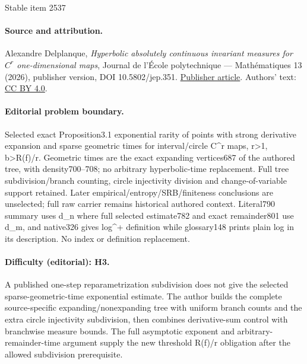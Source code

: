 \documentclass[11pt]{article}
\theoremstyle{definition}
\begin{document}
\begin{center}{\Large Stable item 2537}\end{center}
\paragraph{Source and attribution.}
Alexandre Delplanque, \emph{Hyperbolic absolutely continuous invariant measures for $C^r$ one-dimensional maps}, Journal de l’École polytechnique — Mathématiques 13 (2026), publisher version, DOI 10.5802/jep.351. \href{https://jep.centre-mersenne.org/articles/10.5802/jep.351/}{Publisher article}. Authors' text: \href{https://creativecommons.org/licenses/by/4.0/}{CC BY 4.0}.
\paragraph{Editorial problem boundary.}
Selected exact Proposition3.1 exponential rarity of points with strong derivative expansion and sparse geometric times for interval/circle C\textasciicircum{}r maps, r>1, b>R(f)/r. Geometric times are the exact expanding vertices687 of the authored tree, with density700–708; no arbitrary hyperbolic-time replacement. Full tree subdivision/branch counting, circle injectivity division and change-of-variable support retained. Later empirical/entropy/SRB/finiteness conclusions are unselected; full raw carrier remains historical authored context. Literal790 summary uses d\_n where full selected estimate782 and exact remainder801 use d\_m, and native326 gives log\textasciicircum{}+ definition while glossary148 prints plain log in its description. No index or definition replacement.
\paragraph{Difficulty (editorial): H3.}
A published one-step reparametrization subdivision does not give the selected sparse-geometric-time exponential estimate. The author builds the complete source-specific expanding/nonexpanding tree with uniform branch counts and the extra circle injectivity subdivision, then combines derivative-sum control with branchwise measure bounds. The full asymptotic exponent and arbitrary-remainder-time argument supply the new threshold R(f)/r obligation after the allowed subdivision prerequisite.
\end{document}
